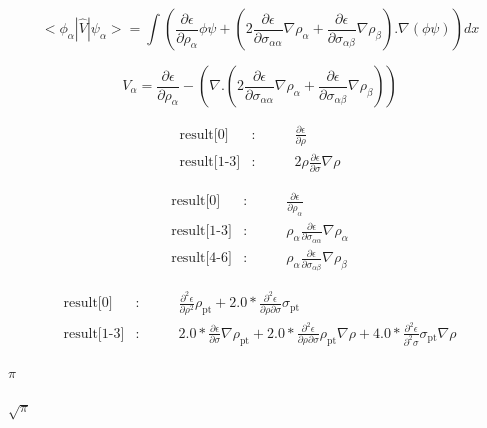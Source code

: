 \documentclass{article}
\begin{document}
\[
  < \phi_{\alpha} | \hat V | \psi_{\alpha} > = \int \left( \frac{\partial \epsilon}{\partial \rho_{\alpha}} \phi \psi
           +  \left( 2 \frac{\partial \epsilon}{\partial \sigma_{\alpha \alpha}} \nabla \rho_{\alpha}
           + \frac{\partial \epsilon}{\partial \sigma_{\alpha \beta}} \nabla \rho_{\beta}  \right) . \nabla \left( \phi \psi \right) \right) dx
\]
\pagebreak

\[
   V_{\alpha} =  \frac{\partial \epsilon}{\partial \rho_{\alpha}}
                 - \left(\nabla . \left(2 \frac{\partial \epsilon}{\partial \sigma_{\alpha \alpha}} \nabla \rho_{\alpha}
                 + \frac{\partial \epsilon}{\partial \sigma_{\alpha \beta}} \nabla \rho_{\beta}  \right)  \right)
\]
\pagebreak

\begin{eqnarray*}
    \mbox{result[0]}    &:& \qquad \frac{\partial \epsilon}{\partial \rho} \\
    \mbox{result[1-3]}  &:& \qquad 2 \rho \frac{\partial \epsilon}{\partial \sigma} \nabla\rho
\end{eqnarray*}
\pagebreak

\begin{eqnarray*}
    \mbox{result[0]}    &:& \qquad \frac{\partial \epsilon}{\partial \rho_{\alpha}} \\
    \mbox{result[1-3]}  &:& \qquad \rho_\alpha \frac{\partial \epsilon}{\partial \sigma_{\alpha \alpha}} \nabla\rho_\alpha\\
    \mbox{result[4-6]}  &:& \qquad \rho_\alpha \frac{\partial \epsilon}{\partial \sigma_{\alpha \beta}} \nabla\rho_\beta
\end{eqnarray*}
\pagebreak

\begin{eqnarray*}
    \mbox{result[0]}    &:& \qquad \frac{\partial^2 \epsilon}{\partial \rho^2} \rho_\mathrm{pt}
                            + 2.0 * \frac{\partial^2 \epsilon}{\partial \rho\partial\sigma}\sigma_\mathrm{pt}\\
    \mbox{result[1-3]}  &:& \qquad 2.0 * \frac{\partial\epsilon}{\partial\sigma}\nabla\rho_\mathrm{pt}
                            + 2.0 * \frac{\partial^2\epsilon}{\partial\rho\partial\sigma} \rho_\mathrm{pt}\nabla\rho
                            + 4.0 * \frac{\partial^2\epsilon}{\partial^2\sigma} \sigma_\mathrm{pt}\nabla\rho
\end{eqnarray*}
\pagebreak

$\pi$
\pagebreak

$\sqrt{\pi}$
\pagebreak
\end{document}
